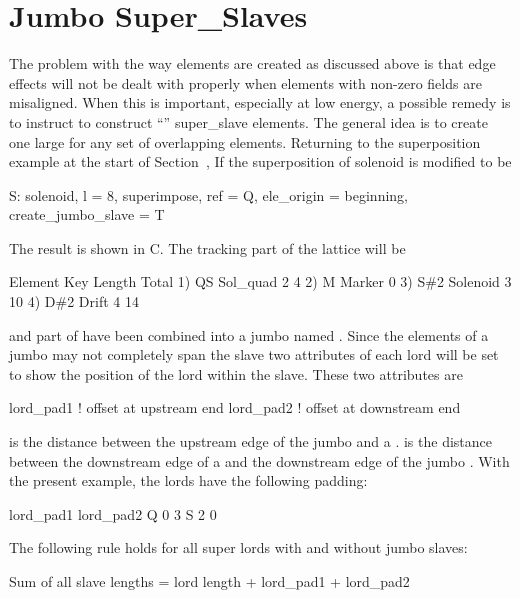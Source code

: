 \section{Jumbo Super_Slaves}
\label{s:jumbo.slave}

The problem with the way  elements are created as discussed above is that edge
effects will not be dealt with properly when elements with non-zero fields are misaligned. When this
is important, especially at low energy, a possible remedy is to instruct \bmad to construct
``'' super_slave elements. The general idea is to create one large  for
any set of overlapping elements. Returning to the superposition example at the start of
Section~, If the superposition of solenoid  is modified to be
\begin{example}
  S: solenoid, l = 8, superimpose, ref = Q, ele_origin = beginning, 
               create_jumbo_slave = T
\end{example}
The result is shown in C. The tracking part of the lattice will be
\begin{example}
        Element   Key         Length  Total     
  1)    Q{\B}S       Sol_quad     2        4
  2)    M         Marker       0      
  3)    S{\#}2       Solenoid     3       10
  4)    D{\#}2       Drift        4       14
\end{example}
 and part of  have been combined into a jumbo  named . Since
the  elements of a jumbo  may not completely span the slave two
attributes of each lord will be set to show the position of the lord within the slave. These two
attributes are
\begin{example}
  lord_pad1    ! offset at upstream end
  lord_pad2    ! offset at downstream end
\end{example}
 is the distance between the upstream edge of the jumbo  and a
.  is the distance between the downstream edge of a  and
the downstream edge of the jumbo . With the present example, the lords have the
following padding:
\begin{example}
          lord_pad1    lord_pad2
  Q            0            3
  S            2            0
\end{example}
The following rule holds for all super lords with and without jumbo slaves:
\begin{example}
  Sum of all slave lengths = lord length + lord_pad1 + lord_pad2
\end{example}

